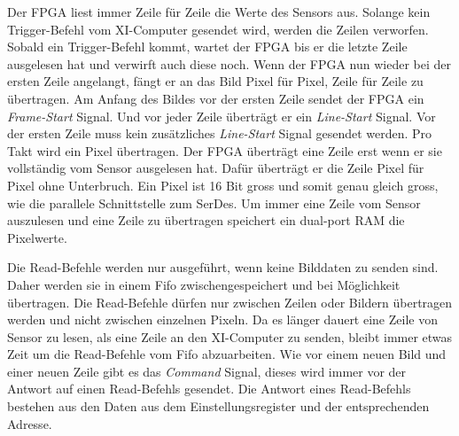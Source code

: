 Der FPGA liest immer Zeile für Zeile die Werte des Sensors aus. Solange kein Trigger-Befehl vom XI-Computer gesendet wird, werden die Zeilen verworfen. Sobald ein Trigger-Befehl kommt, wartet der FPGA bis er die letzte Zeile ausgelesen hat und verwirft auch diese noch. Wenn der FPGA nun wieder bei der ersten Zeile angelangt, fängt er an das Bild Pixel für Pixel, Zeile für Zeile zu übertragen. Am Anfang des Bildes vor der ersten Zeile sendet der FPGA ein \textit{Frame-Start} Signal. Und vor jeder Zeile überträgt er ein \textit{Line-Start} Signal. Vor der ersten Zeile muss kein zusätzliches \textit{Line-Start} Signal gesendet werden. Pro Takt wird ein Pixel übertragen. Der FPGA überträgt eine Zeile erst wenn er sie vollständig vom Sensor ausgelesen hat. Dafür überträgt er die Zeile Pixel für Pixel ohne Unterbruch. Ein Pixel ist 16 Bit gross und somit genau gleich gross, wie die parallele Schnittstelle zum SerDes. Um immer eine Zeile vom Sensor auszulesen und eine Zeile zu übertragen speichert ein dual-port RAM die Pixelwerte.

Die Read-Befehle werden nur ausgeführt, wenn keine Bilddaten zu senden sind. Daher werden sie in einem Fifo zwischengespeichert und bei Möglichkeit übertragen. Die Read-Befehle dürfen nur zwischen Zeilen oder Bildern übertragen werden und nicht zwischen einzelnen Pixeln. Da es länger dauert eine Zeile von Sensor zu lesen, als eine Zeile an den XI-Computer zu senden, bleibt immer etwas Zeit um die Read-Befehle vom Fifo abzuarbeiten. Wie vor einem neuen Bild und einer neuen Zeile gibt es das \textit{Command} Signal, dieses wird immer vor der Antwort auf einen Read-Befehls gesendet. Die Antwort eines Read-Befehls bestehen aus den Daten aus dem Einstellungsregister und der entsprechenden Adresse.

